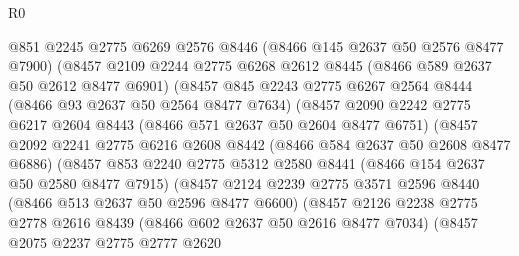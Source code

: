 \begin{lexlean}{R0}
\begin{coremodule}
                    @851
                    @2245
                    @2775
                    @6269
                    @2576
                    @8446
                    (@8466 @145 @2637 @50 @2576 @8477 @7900)
                    (@8457
                      @2109
                      @2244
                      @2775
                      @6268
                      @2612
                      @8445
                      (@8466 @589 @2637 @50 @2612 @8477 @6901)
                      (@8457
                        @845
                        @2243
                        @2775
                        @6267
                        @2564
                        @8444
                        (@8466 @93 @2637 @50 @2564 @8477 @7634)
                        (@8457
                          @2090
                          @2242
                          @2775
                          @6217
                          @2604
                          @8443
                          (@8466 @571 @2637 @50 @2604 @8477 @6751)
                          (@8457
                            @2092
                            @2241
                            @2775
                            @6216
                            @2608
                            @8442
                            (@8466 @584 @2637 @50 @2608 @8477 @6886)
                            (@8457
                              @853
                              @2240
                              @2775
                              @5312
                              @2580
                              @8441
                              (@8466 @154 @2637 @50 @2580 @8477 @7915)
                              (@8457
                                @2124
                                @2239
                                @2775
                                @3571
                                @2596
                                @8440
                                (@8466 @513 @2637 @50 @2596 @8477 @6600)
                                (@8457
                                  @2126
                                  @2238
                                  @2775
                                  @2778
                                  @2616
                                  @8439
                                  (@8466 @602 @2637 @50 @2616 @8477 @7034)
                                  (@8457
                                    @2075
                                    @2237
                                    @2775
                                    @2777
                                    @2620

\end{coremodule}
\end{lexlean}
